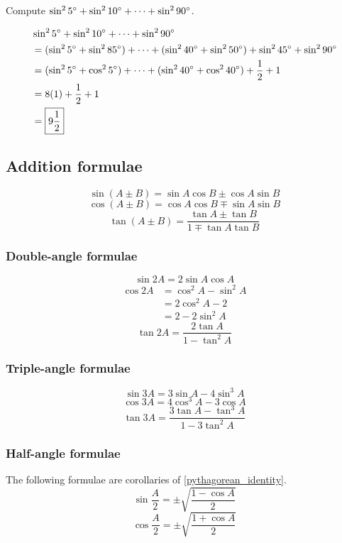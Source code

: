 \begin{exmp}{}{}
Compute $\sin^25\degree+\sin^210\degree+\cdots+\sin^290\degree$.
\end{exmp}
\begin{solution}
\begin{align*}
&\sin^25\degree+\sin^210\degree+\cdots+\sin^290\degree \\
&= (\sin^25\degree+\sin^285\degree) + \cdots + (\sin^240\degree+\sin^250\degree)+\sin^245\degree+\sin^290\degree \\
&= (\sin^25\degree+\cos^25\degree) + \cdots + (\sin^240\degree+\cos^240\degree)+\frac{1}{2}+1 \\
&= 8(1)+\frac{1}{2}+1 \\
&= \boxed{9\frac{1}{2}}
\end{align*}
\end{solution}

\subsection{Addition formulae}
\[ \sin (A \pm B) = \sin A \cos B \pm \cos A \sin B \]
\[ \cos (A \pm B) = \cos A \cos B \mp \sin A \sin B \]
\[ \tan (A \pm B) = \frac{\tan A \pm \tan B}{1 \mp \tan A \tan B} \]

\subsubsection{Double-angle formulae}
\[ \sin 2A = 2 \sin A \cos A \]
\[ \begin{split}
\cos 2A &= \cos^2 A - \sin^2 A \\
&= 2 \cos^2 A - 2 \\
&= 2 - 2 \sin^2 A
\end{split} \]
\[ \tan 2A = \frac{2 \tan A}{1 - \tan^2 A} \]

\subsubsection{Triple-angle formulae}
\[ \sin 3A = 3 \sin A - 4 \sin^3 A \]
\[ \cos 3A = 4 \cos^3 A- 3 \cos A \]
\[ \tan 3A = \frac{3\tan A-\tan^3A}{1-3\tan^2A} \]

\subsubsection{Half-angle formulae}
The following formulae are corollaries of \cref{pythagorean_identity}.
\[ \sin \frac{A}{2} = \pm \sqrt{\frac{1-\cos A}{2}} \]
\[ \cos \frac{A}{2} = \pm \sqrt{\frac{1+\cos A}{2}} \]

